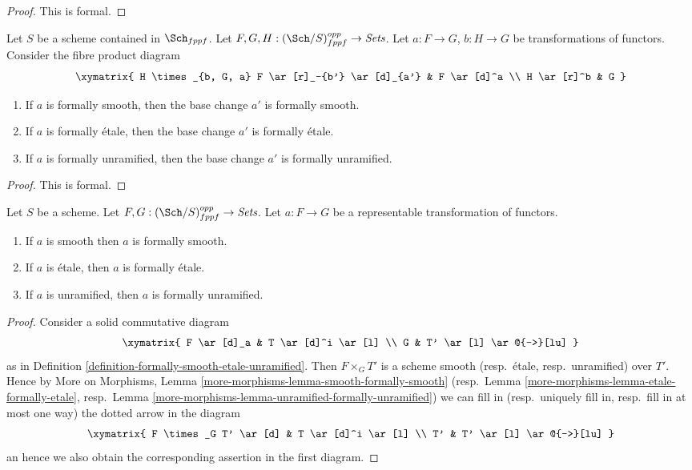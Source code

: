 \begin{proof}
This is formal.
\end{proof}

\begin{lemma}
\label{lemma-base-change-formally-smooth-etale-unramified}
Let $S$ be a scheme contained in $\Sch_{fppf}$.
Let $F, G, H : (\Sch/S)_{fppf}^{opp} \to \textit{Sets}$.
Let $a : F \to G$, $b : H \to G$ be transformations of functors.
Consider the fibre product diagram
$$
\xymatrix{
H \times_{b, G, a} F \ar[r]_-{b'} \ar[d]_{a'} & F \ar[d]^a \\
H \ar[r]^b & G
}
$$
\begin{enumerate}
\item If $a$ is formally smooth, then the base change $a'$ is
formally smooth.
\item If $a$ is formally \'etale, then the base change $a'$ is
formally \'etale.
\item If $a$ is formally unramified, then the base change $a'$ is
formally unramified.
\end{enumerate}
\end{lemma}

\begin{proof}
This is formal.
\end{proof}

\begin{lemma}
\label{lemma-representable-property-formally-property}
Let $S$ be a scheme.
Let $F, G : (\Sch/S)_{fppf}^{opp} \to \textit{Sets}$.
Let $a : F \to G$ be a representable transformation of functors.
\begin{enumerate}
\item If $a$ is smooth then $a$ is formally smooth.
\item If $a$ is \'etale, then $a$ is formally \'etale.
\item If $a$ is unramified, then $a$ is formally unramified.
\end{enumerate}
\end{lemma}

\begin{proof}
Consider a solid commutative diagram
$$
\xymatrix{
F \ar[d]_a & T \ar[d]^i \ar[l] \\
G & T' \ar[l] \ar@{-->}[lu]
}
$$
as in
Definition \ref{definition-formally-smooth-etale-unramified}.
Then $F \times_G T'$ is a scheme smooth (resp.\ \'etale, resp.\ unramified)
over $T'$. Hence by
More on Morphisms, Lemma \ref{more-morphisms-lemma-smooth-formally-smooth}
(resp.\ Lemma \ref{more-morphisms-lemma-etale-formally-etale},
resp.\ Lemma \ref{more-morphisms-lemma-unramified-formally-unramified})
we can fill in (resp.\ uniquely fill in, resp.\ fill in at most
one way) the dotted arrow in the diagram
$$
\xymatrix{
F \times_G T' \ar[d] & T \ar[d]^i \ar[l] \\
T' & T' \ar[l] \ar@{-->}[lu]
}
$$
an hence we also obtain the corresponding assertion in the first diagram.
\end{proof}


